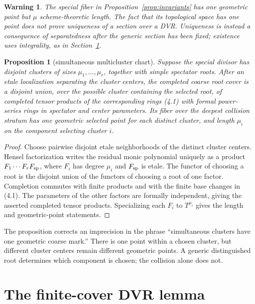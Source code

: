\documentclass[11pt]{article}
\newtheorem{proposition}[theorem]{Proposition}
\newtheorem{warning}[theorem]{Warning}
\begin{document}
\begin{warning}
The special fiber in Proposition~\ref{prop:invariants} has one geometric
point but $\mu$ scheme-theoretic length.  The fact that its topological space
has one point does not prove uniqueness of a section over a DVR.  Uniqueness
is instead a consequence of separatedness after the generic section has
been fixed; existence uses integrality, as in Section~\ref{sec:dvr}.
\end{warning}

\begin{proposition}[simultaneous multicluster chart]\label{prop:multi}
Suppose the special divisor has disjoint clusters of sizes
$\mu_1,\ldots,\mu_r$, together with simple spectator roots.  After an etale
localization separating the cluster centers, the completed coarse root cover
is a disjoint union, over the possible cluster containing the selected root,
of completed tensor products of the corresponding rings (4.1) with formal
power-series rings in spectator and center parameters.  Its fiber over the
deepest collision stratum has one geometric selected point for each distinct
cluster, and length $\mu_i$ on the component selecting cluster $i$.
\end{proposition}

\begin{proof}
Choose pairwise disjoint etale neighborhoods of the distinct cluster centers.
Hensel factorization writes the residual monic polynomial uniquely as a
product $F_1\cdots F_rF_{\rm sp}$, where $F_i$ has degree $\mu_i$ and
$F_{\rm sp}$ is etale.  The functor of choosing a root is the disjoint union
of the functors of choosing a root of one factor.  Completion commutes with
finite products and with the finite base changes in (4.1).  The parameters
of the other factors are formally independent, giving the asserted completed
tensor products.  Specializing each $F_i$ to $T^{\mu_i}$ gives the length and
geometric-point statements.
\end{proof}

The proposition corrects an imprecision in the phrase ``simultaneous
clusters have one geometric coarse mark.''  There is one point within a
chosen cluster, but different cluster centers remain different geometric
points.  A generic distinguished root determines which component is chosen;
the collision alone does not.

\section{The finite-cover DVR lemma}\label{sec:dvr}
\end{document}
